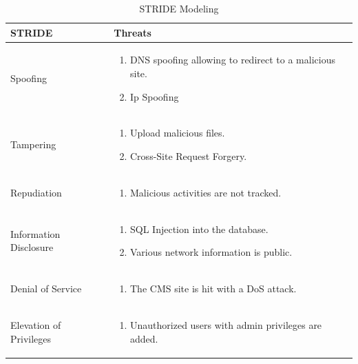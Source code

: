 \begingroup
\centering
\setlength{\tabcolsep}{6.5pt} %
\renewcommand{\arraystretch}{1.8} %
\begin{longtable}{ |p{7cm}| p{8cm} |}
\caption{STRIDE Modeling}
    \label{table:spoofing}
\hline
\rowcolor{grey!15}
\textbf{STRIDE} & \textbf{Threats}\\
\hline
Spoofing & 
\vspace{-\baselineskip}
\begin{enumerate}
    \item DNS spoofing allowing to redirect to a malicious site.
    \item Ip Spoofing \citep[p.~2]{ip_spoofing}
\end{enumerate} \\
\hline
Tampering & 
\vspace{-\baselineskip}
\begin{enumerate}
    \item Upload malicious files.
    \item Cross-Site Request Forgery. \citep[p.~538]{crsf}
\end{enumerate} \\
\hline
Repudiation & 
\vspace{-\baselineskip}
\begin{enumerate}
    \item Malicious activities are not tracked.
\end{enumerate} \\
\hline
Information Disclosure & 
\vspace{-\baselineskip}
\begin{enumerate}
    \item SQL Injection into the database.
    \item Various network information is public.
\end{enumerate} \\
\hline
Denial of Service & 
\vspace{-\baselineskip}
\begin{enumerate}
    \item The CMS site is hit with a DoS attack.
\end{enumerate} \\
\hline
Elevation of Privileges & 
\vspace{-\baselineskip}
\begin{enumerate}
    \item Unauthorized users with admin privileges are added.
\end{enumerate} \\
\hline
\end{longtable}
\endgroup

